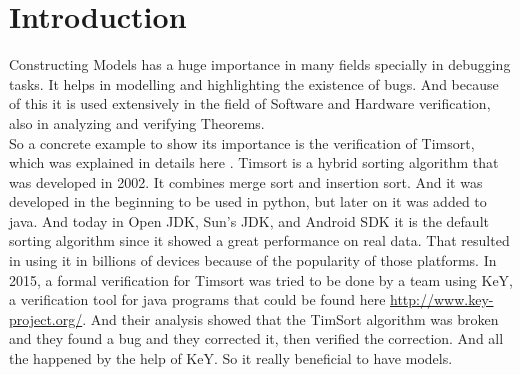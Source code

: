 \chapter{Introduction}\label{chap:intro}

Constructing Models has a huge importance in many fields specially in debugging tasks. It helps in modelling and highlighting the existence of bugs. And because of this it is used extensively in the field of Software and Hardware verification, also in analyzing and verifying Theorems.
\\
So a concrete example to show its importance is the verification of Timsort, which was explained in details here \cite{TIMSORT}. Timsort is a hybrid sorting algorithm that was developed in 2002. It combines merge sort and insertion sort. And it was developed in the beginning to be used in python, but later on it was added to java. And today in Open JDK, Sun's JDK, and Android SDK it is the default sorting algorithm since it showed a great performance on real data. That resulted in using it in billions of devices because of the popularity of those platforms. In 2015, a formal verification for Timsort was tried to be done by a team using KeY, a verification tool for java programs that could be found here \url{http://www.key-project.org/}. And their analysis showed that the TimSort algorithm was broken and they found a bug and they corrected it, then verified the correction. And all the happened by the help of KeY. So it really beneficial to have models. 